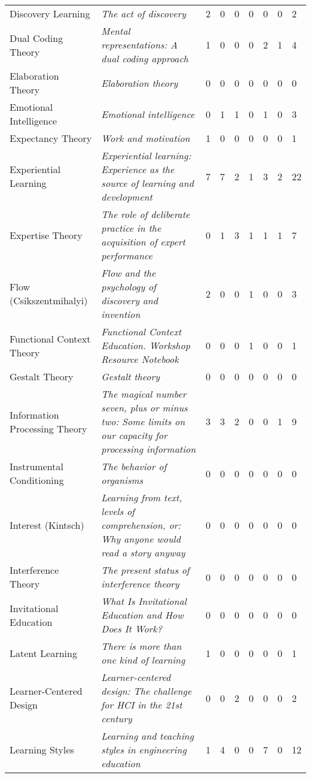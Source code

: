 \begin{table*}[t]
\begin{tabular}{p{3cm}p{7cm}lllllll}
Discovery Learning & \textit{The act of discovery} & 2 & 0 & 0 & 0 & 0 & 0 & 2\\
Dual Coding Theory & \textit{Mental representations: A dual coding approach} & 1 & 0 & 0 & 0 & 2 & 1 & 4\\
Elaboration Theory & \textit{Elaboration theory} & 0 & 0 & 0 & 0 & 0 & 0 & 0\\
Emotional Intelligence & \textit{Emotional intelligence} & 0 & 1 & 1 & 0 & 1 & 0 & 3\\
Expectancy Theory & \textit{Work and motivation} & 1 & 0 & 0 & 0 & 0 & 0 & 1\\
Experiential Learning & \textit{Experiential learning: Experience as the source of learning and development} & 7 & 7 & 2 & 1 & 3 & 2 & 22\\
Expertise Theory & \textit{The role of deliberate practice in the acquisition of expert performance} & 0 & 1 & 3 & 1 & 1 & 1 & 7\\
Flow (Csikszentmihalyi) & \textit{Flow and the psychology of discovery and invention} & 2 & 0 & 0 & 1 & 0 & 0 & 3\\
Functional Context Theory & \textit{Functional Context Education. Workshop Resource Notebook} & 0 & 0 & 0 & 1 & 0 & 0 & 1\\
Gestalt Theory & \textit{Gestalt theory} & 0 & 0 & 0 & 0 & 0 & 0 & 0\\
Information Processing Theory & \textit{The magical number seven, plus or minus two: Some limits on our capacity for processing information} & 3 & 3 & 2 & 0 & 0 & 1 & 9\\
Instrumental Conditioning & \textit{The behavior of organisms} & 0 & 0 & 0 & 0 & 0 & 0 & 0\\
Interest (Kintsch) & \textit{Learning from text, levels of comprehension, or: Why anyone would read a story anyway} & 0 & 0 & 0 & 0 & 0 & 0 & 0\\
Interference Theory & \textit{The present status of interference theory} & 0 & 0 & 0 & 0 & 0 & 0 & 0\\
Invitational Education & \textit{What Is Invitational Education and How Does It Work?} & 0 & 0 & 0 & 0 & 0 & 0 & 0\\
Latent Learning & \textit{There is more than one kind of learning} & 1 & 0 & 0 & 0 & 0 & 0 & 1\\
Learner-Centered Design & \textit{Learner-centered design: The challenge for HCI in the 21st century} & 0 & 0 & 2 & 0 & 0 & 0 & 2\\
Learning Styles & \textit{Learning and teaching styles in engineering education} & 1 & 4 & 0 & 0 & 7 & 0 & 12\\

\end{tabular}
\end{table*}
